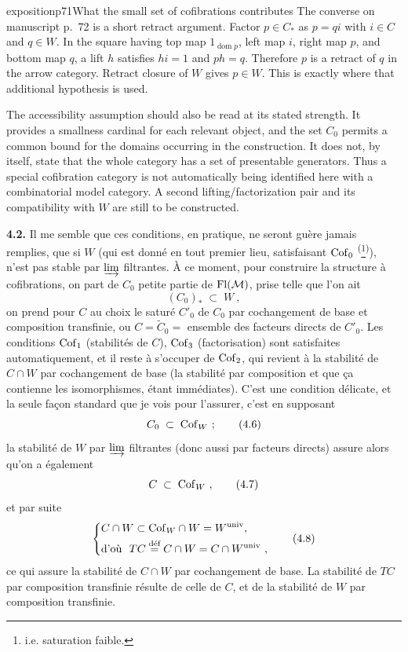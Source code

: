 \begin{dcomment}{exposition}{p71}{What the small set of cofibrations contributes}
The converse on manuscript p.~72 is a short retract argument. Factor $p\in C_*$ as $p=q i$ with $i\in C$ and $q\in W$. In the square having top map $1_{\operatorname{dom}p}$, left map $i$, right map $p$, and bottom map $q$, a lift $h$ satisfies $hi=1$ and $ph=q$. Therefore $p$ is a retract of $q$ in the arrow category. Retract closure of $W$ gives $p\in W$. This is exactly where that additional hypothesis is used.

The accessibility assumption should also be read at its stated strength. It provides a smallness cardinal for each relevant object, and the set $C_0$ permits a common bound for the domains occurring in the construction. It does not, by itself, state that the whole category has a set of presentable generators. Thus a special cofibration category is not automatically being identified here with a combinatorial model category. A second lifting/factorization pair and its compatibility with $W$ are still to be constructed.
\end{dcomment}


\textbf{4.2.} Il me semble que ces conditions, en pratique, ne seront guère jamais remplies, que si $W$ (qui est donné en tout premier lieu, satisfaisant $\Cof_0$ \textsuperscript{(}\footnote[18]{i.e. saturation faible.}\textsuperscript{)}), n'est pas stable par $\varinjlim$
filtrantes. À ce moment, pour construire la structure à cofibrations, on part de $C_0$ petite partie de $\Fl(\mathcal{M})$, prise telle que l'on ait
\[
(C_0)_* \;\subset\; W\ , \tag*{(4.5)}
\]
on prend pour $C$ au choix le saturé $C'_0$ de $C_0$ par cochangement de base et composition transfinie, ou $C = \tilde{C}_0 =$ ensemble des facteurs directs de $C'_0$. Les conditions $\Cof_1$ (stabilités de $C$), $\Cof_3$ (factorisation) sont satisfaites automatiquement, et il reste à s'occuper de $\Cof_2$, qui revient à la stabilité de $C{\cap}W$ par cochangement de base (la stabilité par composition et que ça contienne les isomorphismes, étant immédiates). C'est une condition délicate, et la seule façon standard que je vois pour l'assurer, c'est en supposant
\[
C_0 \;\subset\; \Cof_W\ ; \tag*{(4.6)}
\]
la stabilité de $W$ par $\varinjlim$ filtrantes (donc aussi par facteurs directs) assure alors qu'on a également
\[
C \;\subset\; \Cof_W\ , \tag*{(4.7)}
\]
et par suite
\[
\left\{
\begin{aligned}
& C \cap W \subset \Cof_W \cap W = W^{\mathrm{univ}}, \\
& \text{d'où }\ TC \defeq C \cap W = C \cap W^{\mathrm{univ}}\ ,
\end{aligned}
\right. \tag*{(4.8)}
\]
ce qui assure la stabilité de $C \cap W$ par cochangement de base. La stabilité de $TC$ par composition transfinie résulte de celle de $C$, et de la stabilité de $W$ par composition transfinie.

